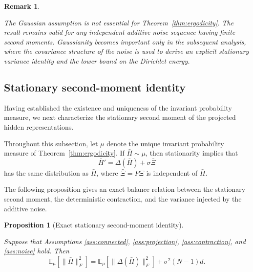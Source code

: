 \documentclass{article}
\newtheorem{proposition}[theorem]{Proposition}
\newtheorem{remark}{Remark}[section]
\begin{document}
\begin{remark}
	\label{rem:ergodicity}
	
	The Gaussian assumption is not essential for
	Theorem~\ref{thm:ergodicity}.
	The result remains valid for any independent additive noise sequence
	having finite second moments.	
	Gaussianity becomes important only in the subsequent analysis,
	where the covariance structure of the noise is used to derive an explicit
	stationary variance identity and the lower bound on the Dirichlet energy.
	
\end{remark}



\subsection{Stationary second-moment identity}
\label{sec:second_moment}

Having established the existence and uniqueness of the invariant
probability measure, we next characterize the stationary second moment
of the projected hidden representations.

Throughout this subsection, let
$\mu$
denote the unique invariant probability measure of
Theorem~\ref{thm:ergodicity}.
If
\(
\bar H\sim\mu
\),
then stationarity implies that
\[
\bar H'
=
\Delta(\bar H)
+
\sigma\bar\Xi
\]
has the same distribution as
$\bar H$,
where
$\bar\Xi=P\Xi$
is independent of
$\bar H$.

The following proposition gives an exact balance relation between the
stationary second moment, the deterministic contraction, and the
variance injected by the additive noise.

\begin{proposition}[Exact stationary second-moment identity]
	\label{prop:variance_identity}
	
Suppose that Assumptions
\ref{ass:connected},
\ref{ass:projection},
\ref{ass:contraction},
and
\ref{ass:noise}
hold.	
	Then	
	\[
	\boxed{
		\mathbb E_\mu
		\!\left[
		\|\bar H\|_F^2
		\right]
		=
		\mathbb E_\mu
		\!\left[
		\|\Delta(\bar H)\|_F^2
		\right]
		+
		\sigma^2 (N-1)d.
	}
	\]	
\end{proposition}
\end{document}
